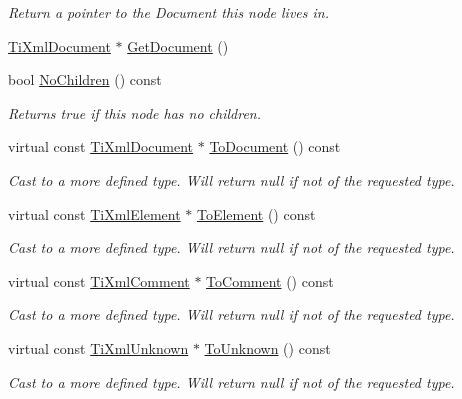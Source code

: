 \begin{DoxyCompactItemize}
\begin{DoxyCompactList}\small\item\em Return a pointer to the Document this node lives in. \item\end{DoxyCompactList}\item 
\hyperlink{classTiXmlDocument}{TiXmlDocument} $\ast$ \hyperlink{classTiXmlNode_a7b2372c0e7adfb32f5b6902fe49a39b2}{GetDocument} ()
\item 
bool \hyperlink{classTiXmlNode_aeed21ad30630ef6e7faf096127edc9f3}{NoChildren} () const 
\begin{DoxyCompactList}\small\item\em Returns true if this node has no children. \item\end{DoxyCompactList}\item 
virtual const \hyperlink{classTiXmlDocument}{TiXmlDocument} $\ast$ \hyperlink{classTiXmlNode_a8a4cda4b15c29f64cff419309aebed08}{ToDocument} () const 
\begin{DoxyCompactList}\small\item\em Cast to a more defined type. Will return null if not of the requested type. \item\end{DoxyCompactList}\item 
virtual const \hyperlink{classTiXmlElement}{TiXmlElement} $\ast$ \hyperlink{classTiXmlNode_a72abed96dc9667ab9e0a2a275301bb1c}{ToElement} () const 
\begin{DoxyCompactList}\small\item\em Cast to a more defined type. Will return null if not of the requested type. \item\end{DoxyCompactList}\item 
virtual const \hyperlink{classTiXmlComment}{TiXmlComment} $\ast$ \hyperlink{classTiXmlNode_aa0a5086f9eaee910bbfdc7f975e26574}{ToComment} () const 
\begin{DoxyCompactList}\small\item\em Cast to a more defined type. Will return null if not of the requested type. \item\end{DoxyCompactList}\item 
virtual const \hyperlink{classTiXmlUnknown}{TiXmlUnknown} $\ast$ \hyperlink{classTiXmlNode_afd7205cf31d7a376929f8a36930627a2}{ToUnknown} () const 
\begin{DoxyCompactList}\small\item\em Cast to a more defined type. Will return null if not of the requested type. \item\end{DoxyCompactList}\item 

\end{DoxyCompactItemize}
